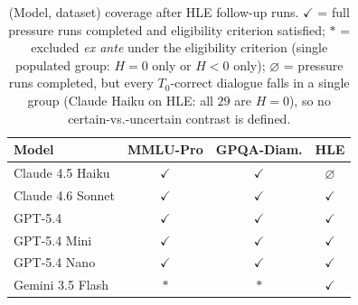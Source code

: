 \begin{table}[t]
\centering
\small
\setlength{\tabcolsep}{6pt}
\renewcommand{\arraystretch}{1.15}
\caption{(Model, dataset) coverage after HLE follow-up runs.
  $\checkmark$ = full pressure runs completed and eligibility
  criterion satisfied; $\ast$ = excluded \emph{ex ante} under the
  eligibility criterion (single populated group: $H{=}0$ only or
  $H{<}0$ only); $\varnothing$ = pressure runs completed, but every
  $T_0$-correct dialogue falls in a single group (Claude Haiku on
  HLE: all $29$ are $H{=}0$), so no certain-vs.-uncertain contrast
  is defined.}
\label{tab:coverage}
\begin{tabular}{l ccc}
\toprule
\textbf{Model} & \textbf{MMLU-Pro} & \textbf{GPQA-Diam.} & \textbf{HLE} \\
\midrule
Claude 4.5 Haiku     & $\checkmark$ & $\checkmark$ & $\varnothing$ \\
Claude 4.6 Sonnet    & $\checkmark$ & $\checkmark$ & $\checkmark$ \\
GPT-5.4              & $\checkmark$ & $\checkmark$ & $\checkmark$ \\
GPT-5.4 Mini         & $\checkmark$ & $\checkmark$ & $\checkmark$ \\
GPT-5.4 Nano         & $\checkmark$ & $\checkmark$ & $\checkmark$ \\
Gemini 3.5 Flash     & $\ast$       & $\ast$       & $\checkmark$ \\
\bottomrule
\end{tabular}
\vspace{2pt}
\end{table}
